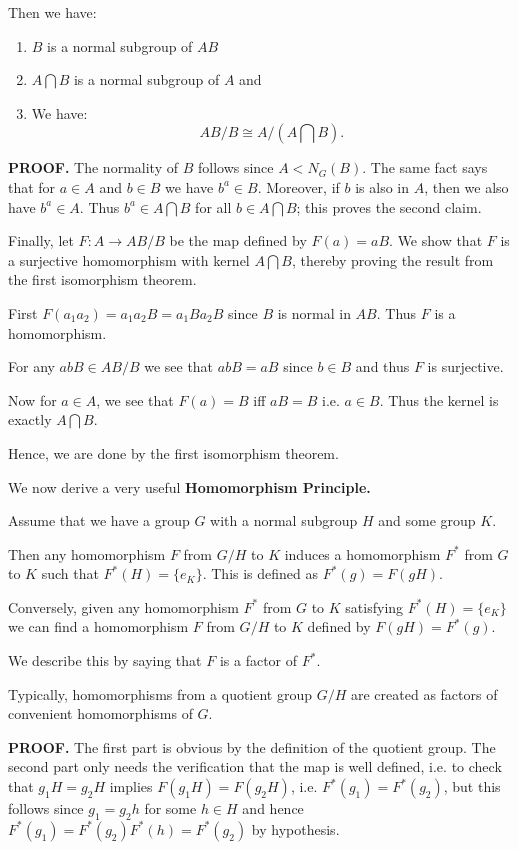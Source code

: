 \documentclass[12pt]{article}
\begin{document}
Then we have:
\begin{enumerate}
\item $B$ is a normal subgroup of $AB$
\item $A \bigcap B $ is a normal subgroup of $A$ and
\item We have: $$AB/B \cong A/(A\bigcap B).$$
\end{enumerate}

{\bf PROOF.}
The normality of $B$ follows since $A< N_G(B)$.
The same fact says that for $a\in A$ and $b\in B$ we have $b^a\in B$.
Moreover, if $b$ is also in $A$,  then we also have $b^a\in A$.
Thus $b^a\in A\bigcap B$ for all $b\in A\bigcap B$; this proves the
second claim.

Finally, let $F:A \rightarrow AB/B$ be the map defined by $F(a)=aB$.
We show that $F$ is a surjective homomorphism with kernel $A\bigcap B$,
thereby proving the result from the first isomorphism theorem.

First $F(a_1a_2)=a_1a_2B = a_1Ba_2B$ since $B$ is normal in $AB$.
Thus $F$ is a homomorphism.

For any $abB\in AB/B$ we see that $abB = aB$ since $b\in B$ and thus $F$
is surjective.

Now for $a\in A$, we see that $F(a)=B$ iff $aB=B$ i.e. $a\in B$. Thus
the kernel is exactly $A\bigcap B$.

Hence, we are done by the first isomorphism theorem.

We now derive a very useful {\bf Homomorphism Principle.}

Assume that we have a group $G$ with a normal subgroup $H$ and some
group $K$.

Then any homomorphism $F$ from $G/H$ to $K$ induces a homomorphism $F^*$
from $G$ to $K$ such that $F^*(H)=\{e_K\}$. This is defined as
$F^*(g)=F(gH)$.

Conversely, given any homomorphism $F^*$ from $G$ to $K$ satisfying
$F^*(H)=\{e_K\}$ we can find a homomorphism $F$ from $G/H$ to $K$ defined
by $F(gH)=F^*(g)$.

We describe this by saying that $F$  is a factor of $F^*$.

Typically, homomorphisms from a quotient group $G/H$ are created as
factors of convenient homomorphisms of $G$.

{\bf PROOF.} The first part is obvious by the definition of the quotient
group. The second part only needs the verification that the map is well
defined, i.e. to check that $g_1H=g_2H$ implies $F(g_1H)=F(g_2H)$, i.e.
$F^*(g_1)=F^*(g_2)$, but this follows since $g_1=g_2h$ for some $h\in H$
and hence $F^*(g_1)=F^*(g_2)F^*(h)=F^*(g_2)$ by hypothesis.
\end{document}
